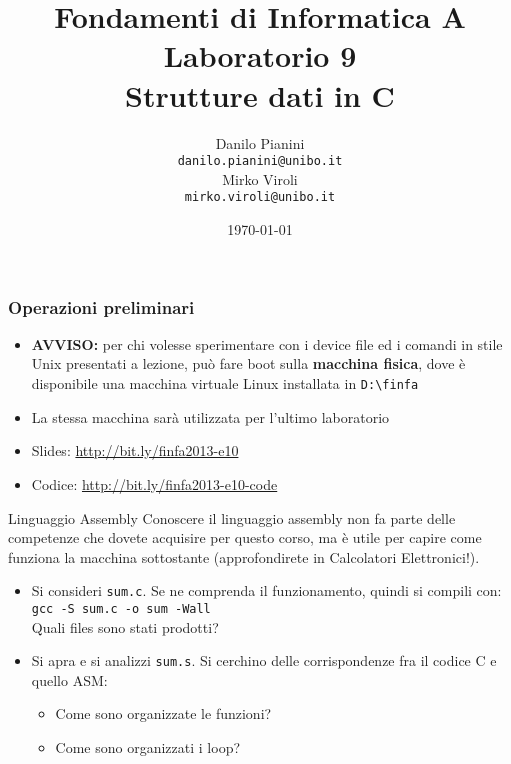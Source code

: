 \documentclass{beamer}
\begin{document}
\title[Lab1 - FV]{Fondamenti di Informatica A \\ Laboratorio 9 \\ Strutture dati in C}
\author[Danilo Pianini]{Danilo Pianini\\\texttt{danilo.pianini@unibo.it} \\ \vspace{3pt} Mirko Viroli\\\texttt{mirko.viroli@unibo.it} }
\date[\today]{\today}

\frame{\titlepage} 

\begin{frame}[fragile]
\frametitle{Operazioni preliminari}
\begin{itemize}
 \item \textbf{AVVISO:} per chi volesse sperimentare con i device file ed i comandi in stile Unix presentati a lezione, può fare boot sulla \textbf{macchina fisica}, dove è disponibile una macchina virtuale Linux installata in \texttt{D:\textbackslash{}finfa}
 \item La stessa macchina sarà utilizzata per l'ultimo laboratorio
 \item Slides: \url{http://bit.ly/finfa2013-e10}
 \item Codice: \url{http://bit.ly/finfa2013-e10-code}
\end{itemize}
\end{frame}

\begin{frame}[fragile]{Linguaggio Assembly}
Conoscere il linguaggio assembly non fa parte delle competenze che dovete acquisire per questo corso, ma è utile per capire come funziona la macchina sottostante (approfondirete in Calcolatori Elettronici!).
\begin{itemize}
 \item Si consideri \texttt{sum.c}. Se ne comprenda il funzionamento, quindi si compili con: \\ \texttt{gcc -S sum.c -o sum -Wall} \\ Quali files sono stati prodotti?
 \item Si apra e si analizzi \texttt{sum.s}. Si cerchino delle corrispondenze fra il codice C e quello ASM:
  \begin{itemize}
    \item Come sono organizzate le funzioni?
    \item Come sono organizzati i loop?
  \end{itemize}
\end{itemize}
\end{frame}
\end{document}
